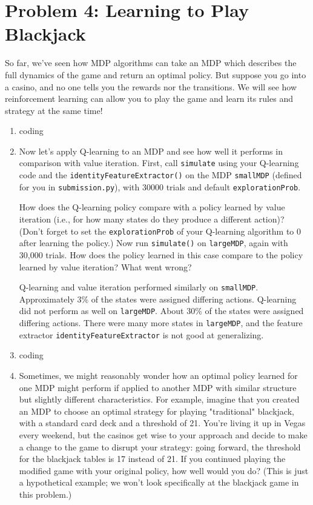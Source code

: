 \documentclass[10pt]{article}
\begin{document}
\section*{\normalsize Problem 4: Learning to Play Blackjack}

So far, we've seen how MDP algorithms can take an MDP which describes the full dynamics of the game and return an optimal policy. But suppose you go into a casino, and no one tells you the rewards nor the transitions. We will see how reinforcement learning can allow you to play the game and learn its rules and strategy at the same time!

\begin{enumerate}[label=(\alph*)]

  \item coding
  
  \item Now let's apply Q-learning to an MDP and see how well it performs in comparison with value iteration. First, call \texttt{simulate} using your Q-learning code and the \texttt{identityFeatureExtractor()} on the MDP \texttt{smallMDP} (defined for you in \texttt{submission.py}), with 30000 trials and default \texttt{explorationProb}.
  
  How does the Q-learning policy compare with a policy learned by value iteration (i.e., for how many states do they produce a different action)? (Don't forget to set the \texttt{explorationProb} of your Q-learning algorithm to 0 after learning the policy.) Now run \texttt{simulate()} on \texttt{largeMDP}, again with 30,000 trials. How does the policy learned in this case compare to the policy learned by value iteration? What went wrong?
  
  Q-learning and value iteration performed similarly on \texttt{smallMDP}. Approximately 3\% of the states were assigned differing actions. Q-learning did not perform as well on \texttt{largeMDP}. About 30\% of the states were assigned differing actions. There were many more states in \texttt{largeMDP}, and the feature extractor \texttt{identityFeatureExtractor} is not good at generalizing.
  
  \item coding
  
  \item Sometimes, we might reasonably wonder how an optimal policy learned for one MDP might perform if applied to another MDP with similar structure but slightly different characteristics. For example, imagine that you created an MDP to choose an optimal strategy for playing "traditional" blackjack, with a standard card deck and a threshold of 21. You're living it up in Vegas every weekend, but the casinos get wise to your approach and decide to make a change to the game to disrupt your strategy: going forward, the threshold for the blackjack tables is 17 instead of 21. If you continued playing the modified game with your original policy, how well would you do? (This is just a hypothetical example; we won't look specifically at the blackjack game in this problem.)


\end{enumerate}
\end{document}
